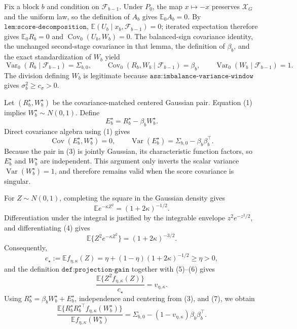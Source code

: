 Fix a block \(b\) and condition on \(\mathcal F_{b-1}\).  Under \(P_0\), the map \(x\mapsto-x\) preserves \(\mathcal X_G\) and the uniform law, so the definition of \(A_b\) gives \(\mathbb E_0A_b=0\).  By \(\texttt{lem:score-decomposition}\), \(\mathbb E(U_b\mid x_b,\mathcal F_{b-1})=0\); iterated expectation therefore gives \(\mathbb E_0R_b=0\) and \(\operatorname{Cov}_0(U_b,W_b)=0\).  The balanced-sign covariance identity, the unchanged second-stage covariance in that lemma, the definition of \(\beta_b\), and the exact standardization of \(W_b\) yield
\[
 \operatorname{Var}_0(R_b\mid\mathcal F_{b-1})=\Sigma_{b,0},
 \qquad
 \operatorname{Cov}_0(R_b,W_b\mid\mathcal F_{b-1})=\beta_b,
 \qquad
 \operatorname{Var}_0(W_b\mid\mathcal F_{b-1})=1.                       \tag{1}
\]
The division defining \(W_b\) is legitimate because \(\texttt{ass:imbalance-variance-window}\) gives \(\sigma_b^2\geq c_\sigma>0\).

Let \((R_b^\star,W_b^\star)\) be the covariance-matched centered Gaussian pair.  Equation (1) implies \(W_b^\star\sim N(0,1)\).  Define
\[
 E_b^\star=R_b^\star-\beta_bW_b^\star.                                  \tag{2}
\]
Direct covariance algebra using (1) gives
\[
 \operatorname{Cov}(E_b^\star,W_b^\star)=0,
 \qquad
 \operatorname{Var}(E_b^\star)=\Sigma_{b,0}-\beta_b\beta_b^\top.       \tag{3}
\]
Because the pair in (3) is jointly Gaussian, its characteristic function factors, so \(E_b^\star\) and \(W_b^\star\) are independent.  This argument only inverts the scalar variance \(\operatorname{Var}(W_b^\star)=1\), and therefore remains valid when the score covariance is singular.

For \(Z\sim N(0,1)\), completing the square in the Gaussian density gives
\[
 \mathbb Ee^{-\kappa Z^2}=(1+2\kappa)^{-1/2}.                            \tag{4}
\]
Differentiation under the integral is justified by the integrable envelope \(z^2e^{-z^2/2}\), and differentiating (4) gives
\[
 \mathbb E\{Z^2e^{-\kappa Z^2}\}=(1+2\kappa)^{-3/2}.                   \tag{5}
\]
Consequently,
\[
 c_\star:=\mathbb Ef_{\eta,\kappa}(Z)
 =\eta+(1-\eta)(1+2\kappa)^{-1/2}\geq\eta>0,                            \tag{6}
\]
and the definition \(\texttt{def:projection-gain}\) together with (5)--(6) gives
\[
 \frac{\mathbb E\{Z^2f_{\eta,\kappa}(Z)\}}{c_\star}
 =v_{\eta,\kappa}.                                                       \tag{7}
\]
Using \(R_b^\star=\beta_bW_b^\star+E_b^\star\), independence and centering from (3), and (7), we obtain
\[
 \frac{\mathbb E\{R_b^\star R_b^{\star\top}
                     f_{\eta,\kappa}(W_b^\star)\}}
      {\mathbb Ef_{\eta,\kappa}(W_b^\star)}
 =\Sigma_{b,0}-(1-v_{\eta,\kappa})\beta_b\beta_b^\top.                \tag{8}
\]

